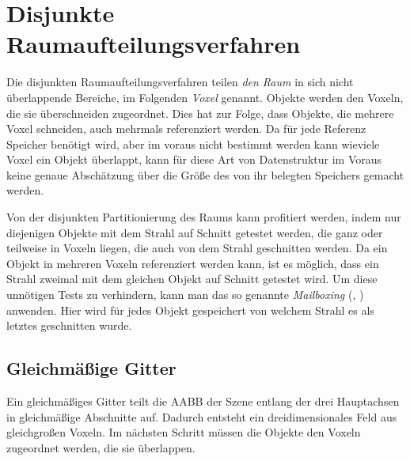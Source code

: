 \section{Disjunkte Raumaufteilungsverfahren}
\label{sec:dsijointstructs}
Die disjunkten Raumaufteilungsverfahren teilen \textit{den Raum} in sich nicht überlappende Bereiche, im Folgenden \textit{Voxel} genannt. Objekte werden den Voxeln, die sie überschneiden zugeordnet. Dies hat zur Folge, dass Objekte, die mehrere Voxel schneiden, auch mehrmals referenziert werden. Da für jede Referenz Speicher benötigt wird, aber im voraus nicht bestimmt werden kann wieviele Voxel ein Objekt überlappt, kann für diese Art von Datenstruktur im Voraus keine genaue Abschätzung über die Größe des von ihr belegten Speichers gemacht werden.

Von der disjunkten Partitionierung des Raums kann profitiert werden, indem nur diejenigen Objekte mit dem Strahl auf Schnitt getestet werden, die ganz oder teilweise in Voxeln liegen, die auch von dem Strahl geschnitten werden. Da ein Objekt in mehreren Voxeln referenziert werden kann, ist es möglich, dass ein Strahl zweimal mit dem gleichen Objekt auf Schnitt getestet wird. Um diese unnötigen Tests zu verhindern, kann man das so genannte \textit{Mailboxing} (\cite{Benthin06}, \cite{Glassner89}) anwenden. Hier wird für jedes Objekt gespeichert von welchem Strahl es als letztes geschnitten wurde. 

\subsection{Gleichmäßige Gitter}
\label{sec:grids}
Ein gleichmäßiges Gitter teilt die AABB der Szene entlang der drei Hauptachsen in gleichmäßige Abschnitte auf. Dadurch entsteht ein dreidimensionales Feld aus gleichgroßen Voxeln. Im nächsten Schritt müssen die Objekte den Voxeln zugeordnet werden, die sie überlappen.

